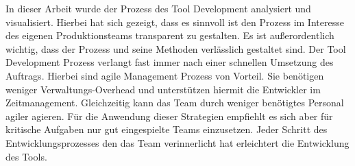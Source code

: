 \documentclass[pagesize, paper=a4, fontsize=12pt, titlepage=true, headings=small, headnosepline, abstractoff, liststotoc, nochapterprefix, plainheadsepline, twoside]{scrreprt}
\begin{document}
In dieser Arbeit wurde der Prozess des Tool Development analysiert und visualisiert. Hierbei hat sich gezeigt, dass es sinnvoll ist den Prozess im Interesse des eigenen Produktionsteams transparent zu gestalten. Es ist außerordentlich wichtig, dass der Prozess und seine Methoden verlässlich gestaltet sind. Der Tool Development Prozess verlangt fast immer nach einer schnellen Umsetzung des Auftrags. Hierbei sind agile Management Prozess von Vorteil. Sie benötigen weniger Verwaltungs-Overhead und unterstützen hiermit die Entwickler im Zeitmanagement. Gleichzeitig kann das Team durch weniger benötigtes Personal agiler agieren. Für die Anwendung dieser Strategien empfiehlt es sich aber für kritische Aufgaben nur gut eingespielte Teams einzusetzen. Jeder Schritt des Entwicklungsprozesses den das Team verinnerlicht hat erleichtert die Entwicklung des Tools.\\
\end{document}
